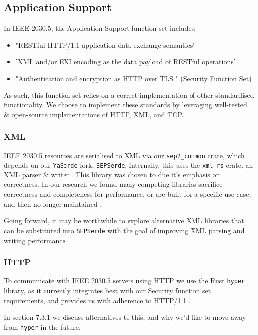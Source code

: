 \subsection{Application Support}
In IEEE 2030.5, the Application Support function set includes:

\begin{itemize}
    \item "RESTful HTTP/1.1 application data exchange semantics"
    \item 'XML and/or EXI encoding as the data payload of RESTful operations'
    \item "Authentication and encryption as HTTP over TLS " (Security Function Set)
\end{itemize}

\cite{IEEE2030.5}

As such, this function set relies on a correct implementation of other standardised functionality. We choose to implement these standards by leveraging well-tested \& open-source implementations of HTTP, XML, and TCP.

\subsubsection{XML}
IEEE 2030.5 resources are serialised to XML via our \texttt{sep2\_common} crate, which depends on our \texttt{YaSerde} fork, \texttt{SEPSerde}. Internally, this uses the \texttt{xml-rs} crate, an XML parser \& writer \cite{xmlrs}. This library was chosen to due it's emphasis on correctness. In our research we found many competing libraries sacrifice correctness and completeness for performance, or are built for a specific use case, and then no longer maintained \cite{xmlrsperformance}.

Going forward, it may be worthwhile to explore alternative XML libraries that can be substituted into \texttt{SEPSerde} with the goal of improving XML parsing and writing performance. 

\subsubsection{HTTP}
To communicate with IEEE 2030.5 servers using HTTP we use the Rust \texttt{hyper} library, as it currently integrates best with our Security function set requirements, and provides us with adherence to HTTP/1.1 \cite{hyper}. 

In section 7.3.1 we discuss alternatives to this, and why we'd like to move away from \texttt{hyper} in the future.

